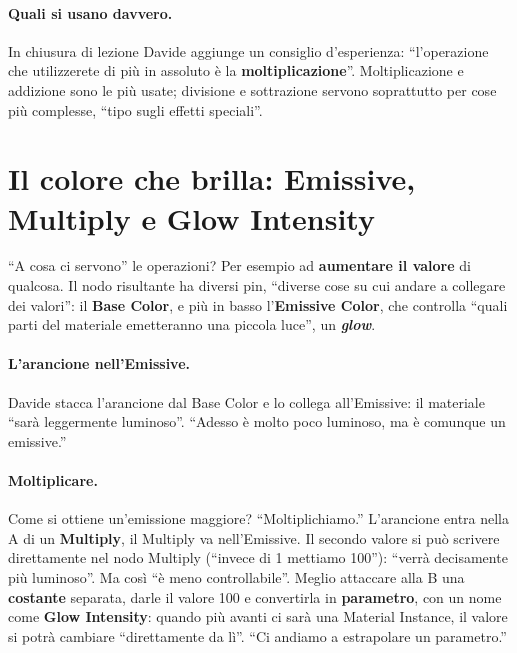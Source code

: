 \paragraph{Quali si usano davvero.} In chiusura di lezione Davide aggiunge un consiglio
d'esperienza: ``l'operazione che utilizzerete di più in assoluto è la
\textbf{moltiplicazione}''. Moltiplicazione e addizione sono le più usate; divisione e
sottrazione servono soprattutto per cose più complesse, ``tipo sugli effetti
speciali''.

\section{Il colore che brilla: Emissive, Multiply e Glow Intensity}
\label{ue3:sec:emissive}

``A cosa ci servono'' le operazioni? Per esempio ad \textbf{aumentare il valore} di
qualcosa. Il nodo risultante ha diversi pin, ``diverse cose su cui andare a collegare
dei valori'': il \textbf{Base Color}, e più in basso l'\textbf{Emissive Color}, che
controlla ``quali parti del materiale emetteranno una piccola luce'', un
\textbf{\emph{glow}}.

\paragraph{L'arancione nell'Emissive.} Davide stacca l'arancione dal Base Color e lo
collega all'Emissive: il materiale ``sarà leggermente luminoso''. ``Adesso è molto poco
luminoso, ma è comunque un emissive.''

\paragraph{Moltiplicare.} Come si ottiene un'emissione maggiore? ``Moltiplichiamo.''
L'arancione entra nella A di un \textbf{Multiply}, il Multiply va nell'Emissive. Il
secondo valore si può scrivere direttamente nel nodo Multiply (``invece di 1 mettiamo
100''): ``verrà decisamente più luminoso''. Ma così ``è meno controllabile''. Meglio
attaccare alla B una \textbf{costante} separata, darle il valore 100 e convertirla in
\textbf{parametro}, con un nome come \textbf{Glow Intensity}: quando più avanti ci sarà
una Material Instance, il valore si potrà cambiare ``direttamente da lì''. ``Ci andiamo
a estrapolare un parametro.''

